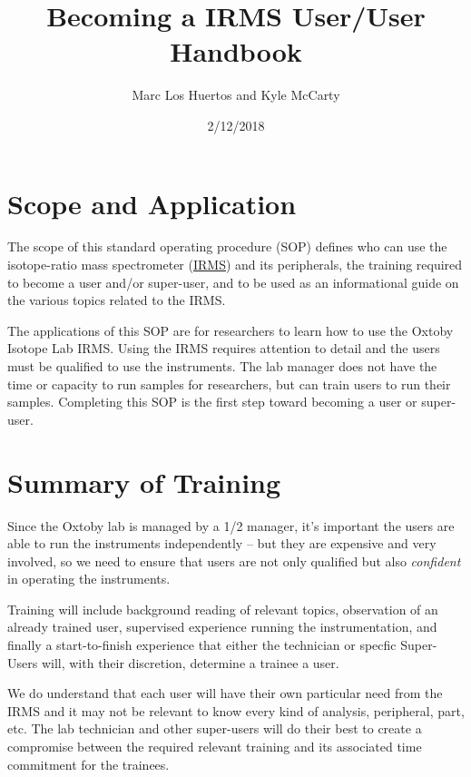 \documentclass[12pt]{../SOP3}\usepackage[]{graphicx}\usepackage[]{color}
\title{Becoming a IRMS User/User Handbook}
\date{2/12/2018}
\author{Marc Los Huertos and Kyle McCarty}
\begin{document}
\maketitle

\section{Scope and Application}

\NP The scope of this standard operating procedure (SOP) defines who can use the isotope-ratio mass spectrometer (\hyperref[IRMS]{IRMS}) and its peripherals, the training required to become a user and/or super-user, and to be used as an informational guide on the various topics related to the IRMS.

\NP The applications of this SOP are for researchers to learn how to use the Oxtoby Isotope Lab IRMS. Using the IRMS requires attention to detail and the users must be qualified to use the instruments. The lab manager does not have the time or capacity to run samples for researchers, but can train users to run their samples. Completing this SOP is the first step toward becoming a user or super-user.

\section{Summary of Training}

\NP Since the Oxtoby lab is managed by a 1/2 manager, it's important the users are able to run the instruments independently -- but they are expensive and very involved, so we need to ensure that users are not only qualified but also \emph{confident} in operating the instruments.

\NP Training will include background reading of relevant topics, observation of an already trained user, supervised experience running the instrumentation, and finally a start-to-finish experience that either the technician or specfic Super-Users will, with their discretion, determine a trainee a user.

\NP We do understand that each user will have their own particular need from the IRMS and it may not be relevant to know every kind of analysis, peripheral, part, etc. The lab technician and other super-users will do their best to create a compromise between the required relevant training and its associated time commitment for the trainees.

\newpage

\tableofcontents
\end{document}
